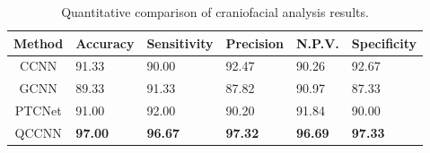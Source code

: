 \begin{table}[h!]
\centering
\begin{tabular}{c|CCCCC}
\toprule
Method  & Accuracy  & Sensitivity & Precision    & N.P.V.   & Specificity   \\\hline
CCNN    & 91.33     & 90.00     & 92.47     & 90.26         & 92.67 \\
GCNN    & 89.33     & 91.33     & 87.82     & 90.97         & 87.33\\ 
PTCNet   & 91.00     & 92.00     & 90.20     & 91.84         & 90.00\\ 
QCCNN   & \bf 97.00     & \bf 96.67     & \bf 97.32     & \bf 96.69         & \bf 97.33
\\\hline
\bottomrule
\end{tabular}
\caption{Quantitative comparison of craniofacial analysis results.}
\label{tb:Craniofacial}
\end{table}
